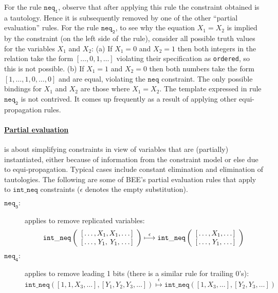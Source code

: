 \documentclass{tlp}
\newcommand{\bee}{\textsf{BEE}}
\begin{document}
For the  rule $\mathtt{neq_1}$, observe that after applying this
rule the constraint obtained is a tautology. Hence it is subsequently
removed by one of the other ``partial evaluation'' rules.
For the rule $\mathtt{neq_2}$, to see why the equation
$X_1=X_2$ is implied by the constraint (on the left side of the rule),
consider all possible truth values for the variables $X_1$ and $X_2$:
(a) If $X_1=0$ and $X_2=1$ then both integers in the relation take the
form $[\ldots,0,1,\ldots]$ violating their specification as
\texttt{ordered}, so this is not possible. (b) If $X_1=1$ and $X_2=0$
then both numbers take the form $[1,\ldots,1,0,\ldots,0]$ and are
equal, violating the $\mathtt{neq}$ constraint. The only possible
bindings for $X_1$ and $X_2$ are those where $X_1=X_2$. 
The template expressed in rule $\mathtt{neq_2}$ is not contrived. It
comes up frequently as a result of applying other equi-propagation
rules. 

\vspace{-3mm}
\paragraph{\underline{Partial evaluation}} is about simplifying
constraints in view of variables that are (partially) instantiated,
either because of information from the constraint model or else due to
equi-propagation. Typical cases include constant elimination and
elimination of tautologies.
The following are some of \bee's partial evaluation rules that apply
to $\mathtt{int\_neq}$ constraints ($\epsilon$ denotes the empty
substitution). 

\begin{description}
\item[$\mathtt{neq_3}:$] applies to remove replicated variables:
\[
\mathtt{int\_neq}\left( 
\begin{array}{cccc}
{[}\ldots,\hspace{-3mm}&X_1,\hspace{-3mm}&X_1,\hspace{-3mm}& \ldots{]} \\
{[}\ldots,\hspace{-3mm}&Y_1,\hspace{-3mm}&Y_1,\hspace{-3mm}&  \ldots{]}
\end{array}
\right)
\overset{\epsilon}{\longmapsto}
\mathtt{int\_neq}\left(
\begin{array}{ccc}
{[}\ldots,\hspace{-3mm}&X_1,\hspace{-3mm}& \ldots{]} \\
{[}\ldots,\hspace{-3mm}&Y_1,\hspace{-3mm}&  \ldots{]}
\end{array}
\right)
\]

\item[$\mathtt{neq_4}:$] applies to remove leading 1 bits (there is a
  similar rule for trailing 0's):
\[
\mathtt{int\_neq}([1,1,X_3,\ldots], [Y_1,Y_2,Y_3,\ldots]) 
   \overset{\epsilon}{\longmapsto}
 \mathtt{int\_neq}([1,X_3,\ldots],[Y_2,Y_3,\ldots])
\]
\end{description}
\end{document}
